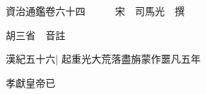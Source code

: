 






























































資治通鑑卷六十四　　　宋　司馬光　撰

胡三省　音註

漢紀五十六|{
	起重光大荒落盡旃蒙作噩凡五年}


孝獻皇帝已

